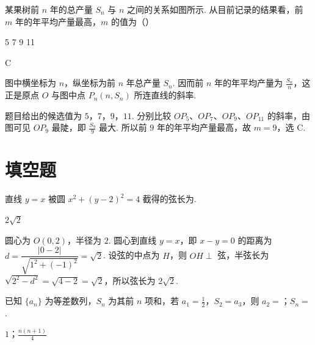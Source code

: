 \begin{problem}
某果树前 \(n\) 年的总产量 \(S_n\) 与 \(n\) 之间的关系如图所示. 从目前记录的结果看，前 \(m\) 年的年平均产量最高，\(m\) 的值为（\quad）


\choices
    {5}
    {7}
    {9}
    {11}
\end{problem}

\begin{answer}
C
\end{answer}

\begin{solution}
图中横坐标为 \(n\)，纵坐标为前 \(n\) 年总产量 \(S_n\). 因而前 \(n\) 年的年平均产量为 \(\frac{S_n}{n}\)，这正是原点 \(O\) 与图中点 \(P_n(n,S_n)\) 所连直线的斜率.

题目给出的候选值为 \(5\)，\(7\)，\(9\)，\(11\). 分别比较 \(OP_5\)、\(OP_7\)、\(OP_9\)、\(OP_{11}\) 的斜率，由图可见 \(OP_9\) 最陡，即 \(\frac{S_9}{9}\) 最大. 所以前 \(9\) 年的年平均产量最高，故 \(m=9\)，选 C.
\end{solution}

\section{填空题}

\begin{problem}
直线 \(y = x\) 被圆 \(x^2 + (y - 2)^2 = 4\) 截得的弦长为\fillinblank{}.
\end{problem}

\begin{answer}
\(2\sqrt{2}\)
\end{answer}

\begin{solution}
圆心为 \(O(0,2)\)，半径为 \(2\). 圆心到直线 \(y=x\)，即 \(x-y=0\) 的距离为
\(d=\dfrac{|0-2|}{\sqrt{1^2+(-1)^2}}=\sqrt{2}\). 设弦的中点为 \(H\)，则 \(OH\perp\) 弦，半弦长为
\(\sqrt{2^2-d^2}=\sqrt{4-2}=\sqrt{2}\)，所以弦长为 \(2\sqrt{2}\).
\end{solution}

\begin{problem}
已知 \(\{a_n\}\) 为等差数列，\(S_n\) 为其前 \(n\) 项和，若 \(a_1 = \frac{1}{2}\)，\(S_2 = a_3\)，则 \(a_2=\)\fillinblank{}；\(S_n=\)\fillinblank{}.
\end{problem}

\begin{answer}
\(1\)；\(\frac{n(n+1)}{4}\)
\end{answer}

